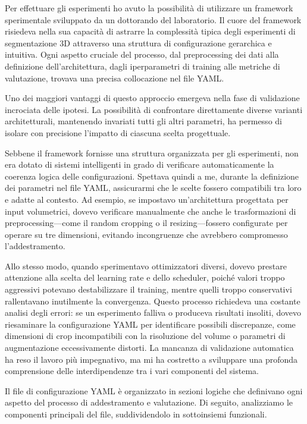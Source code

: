 
Per effettuare gli esperimenti ho avuto la possibilità di utilizzare un framework sperimentale sviluppato da un dottorando del laboratorio. Il cuore del framework risiedeva nella sua capacità di astrarre la complessità tipica degli esperimenti di segmentazione 3D attraverso una struttura di configurazione gerarchica e intuitiva. Ogni aspetto cruciale del processo, dal preprocessing dei dati alla definizione dell'architettura, dagli iperparametri di training alle metriche di valutazione, trovava una precisa collocazione nel file YAML.

Uno dei maggiori vantaggi di questo approccio emergeva nella fase di validazione incrociata delle ipotesi. La possibilità di confrontare direttamente diverse varianti architetturali, mantenendo invariati tutti gli altri parametri, ha permesso di isolare con precisione l'impatto di ciascuna scelta progettuale.


Sebbene il framework fornisse una struttura organizzata per gli esperimenti, non era dotato di sistemi intelligenti in grado di verificare automaticamente la coerenza logica delle configurazioni. Spettava quindi a me, durante la definizione dei parametri nel file YAML, assicurarmi che le scelte fossero compatibili tra loro e adatte al contesto. Ad esempio, se impostavo un'architettura progettata per input volumetrici, dovevo verificare manualmente che anche le trasformazioni di preprocessing—come il random cropping o il resizing—fossero configurate per operare su tre dimensioni, evitando incongruenze che avrebbero compromesso l'addestramento. 


Allo stesso modo, quando sperimentavo ottimizzatori diversi, dovevo prestare attenzione alla scelta del learning rate e dello scheduler, poiché valori troppo aggressivi potevano destabilizzare il training, mentre quelli troppo conservativi rallentavano inutilmente la convergenza. Questo processo richiedeva una costante analisi degli errori: se un esperimento falliva o produceva risultati insoliti, dovevo riesaminare la configurazione YAML per identificare possibili discrepanze, come dimensioni di crop incompatibili con la risoluzione del volume o parametri di augmentazione eccessivamente distorti. La mancanza di validazione automatica ha reso il lavoro più impegnativo, ma mi ha costretto a sviluppare una profonda comprensione delle interdipendenze tra i vari componenti del sistema.


Il file di configurazione YAML è organizzato in sezioni logiche che definivano ogni aspetto del processo di addestramento e valutazione. Di seguito, analizziamo le componenti principali del file, suddividendolo in sottoinsiemi funzionali.

